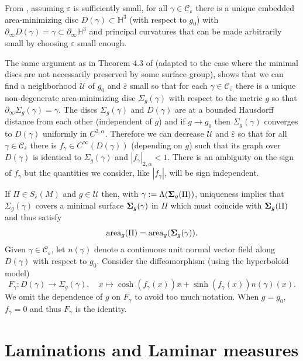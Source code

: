 \documentclass[11pt]{amsart}
\def\H{\mathbb H}
\theoremstyle{remark}
\theoremstyle{definition}
\begin{document}
{{	
	From \cite{seppi}, assuming $\varepsilon$ is sufficiently small, for all $\gamma\in \mathcal C_\varepsilon$ there is a unique embedded area-minimizing   disc $D(\gamma)\subset \H^3$  (with respect to $g_0$) with $\partial_{\infty}D(\gamma)=\gamma\subset \partial_{\infty}\H^3$ and principal curvatures that can be made arbitrarily small by choosing $\varepsilon$ small enough. 
	
	The same argument as in Theorem 4.3 of \cite{lowe2} (adapted to the case {where the minimal discs}  are not necessarily preserved by some surface group),  shows that we can find a neighborhood $\mathcal U$ of $g_0$ and $\bar \varepsilon$ small so that for each $\gamma\in \mathcal C_{\bar \varepsilon}$ there is a unique non-degenerate area-minimizing disc $\Sigma_g(\gamma)$ with respect to the metric $g$ so that $\partial_{\infty}\Sigma_{g}(\gamma)=\gamma$. The discs $\Sigma_g(\gamma)$ and $D(\gamma)$ are at a bounded Hausdorff distance from each other (independent of $g$) and if $g\to g_0$ then $\Sigma_g(\gamma)$ converges to $D(\gamma)$ uniformly in $C^{2,\alpha}$.  {Therefore  we} can decrease $\mathcal U$ and $\bar \varepsilon$ so that for all $\gamma\in  \mathcal C_{\bar \varepsilon}$ there is $f_\gamma\in C^{\infty}(D(\gamma))$ (depending on $g$) such that its graph over $D(\gamma)$ is identical to $\Sigma_g(\gamma)$ and {$|f_{\gamma}|_{2,\alpha}<1$.} There is an ambiguity on the sign of $f_\gamma$ but the quantities we consider, like $|f_\gamma|$, will be sign independent. 
	
	{If $\Pi\in S_{\bar \varepsilon}(M)$ and $g\in \mathcal U$ then, with  {$\gamma:=\Lambda({\bf \Sigma}_g(\Pi))$},  uniqueness implies that $\Sigma_g(\gamma)$ covers a minimal surface ${\bf \Sigma}_g(\gamma)$ in $\Pi$ which must coincide with ${\bf \Sigma}_g(\Pi)$ and thus satisfy  $$\text{area}_g(\Pi)=\text{area}_g({\bf \Sigma}_g(\gamma)).$$}
	{Given $\gamma\in \mathcal C_{\varepsilon}$, let $n(\gamma)$ denote a  continuous unit normal vector field along $D(\gamma)$ with respect to $g_0$.} Consider  the diffeomorphism (using the hyperboloid model)
	\begin{equation}\label{mapF}
		F_{\gamma}: D(\gamma)\rightarrow \Sigma_{g}(\gamma),\quad x\mapsto \cosh(f_{\gamma}(x))x+\sinh(f_{\gamma}(x))n(\gamma)(x).
	\end{equation}
	We omit the dependence of $g$ on $F_{\gamma}$ to avoid too much notation. When $g=g_0$,  $f_{\gamma}=0$ and thus $F_{\gamma}$ is the identity.
	
	\section{Laminations and Laminar measures}\label{measures.labourie}
	
}}
\end{document}
